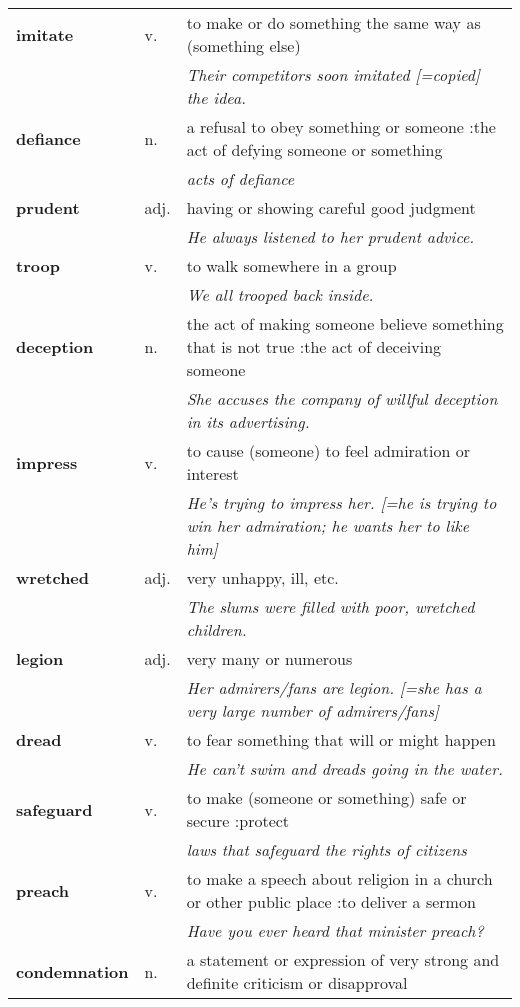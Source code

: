 \documentclass[a4paper]{article}
\begin{document}
\begin{longtable}{llp{11cm}}
\textbf{imitate} & v. &  to make or do something the same way as (something else) \\
 & & \textit{Their competitors soon imitated [=copied] the idea.}\\[0.08cm]
\textbf{defiance} & n. &  a refusal to obey something or someone :the act of defying someone or something \\
 & & \textit{acts of defiance}\\[0.08cm]
\textbf{prudent} & adj. &  having or showing careful good judgment \\
 & & \textit{He always listened to her prudent advice.}\\[0.08cm]
\textbf{troop} & v. &  to walk somewhere in a group \\
 & & \textit{We all trooped back inside.}\\[0.08cm]
\textbf{deception} & n. &  the act of making someone believe something that is not true :the act of deceiving someone \\
 & & \textit{She accuses the company of willful deception in its advertising.}\\[0.08cm]
\textbf{impress} & v. &  to cause (someone) to feel admiration or interest \\
 & & \textit{He's trying to impress her. [=he is trying to win her admiration; he wants her to like him]}\\[0.08cm]
\textbf{wretched} & adj. &  very unhappy, ill, etc. \\
 & & \textit{The slums were filled with poor, wretched children.}\\[0.08cm]
\textbf{legion} & adj. &  very many or numerous \\
 & & \textit{Her admirers/fans are legion. [=she has a very large number of admirers/fans]}\\[0.08cm]
\textbf{dread} & v. &  to fear something that will or might happen \\
 & & \textit{He can't swim and dreads going in the water.}\\[0.08cm]
\textbf{safeguard} & v. &  to make (someone or something) safe or secure :protect \\
 & & \textit{laws that safeguard the rights of citizens}\\[0.08cm]
\textbf{preach} & v. &  to make a speech about religion in a church or other public place :to deliver a sermon \\
 & & \textit{Have you ever heard that minister preach?}\\[0.08cm]
\textbf{condemnation} & n. &  a statement or expression of very strong and definite criticism or disapproval \\

\end{longtable}
\end{document}
